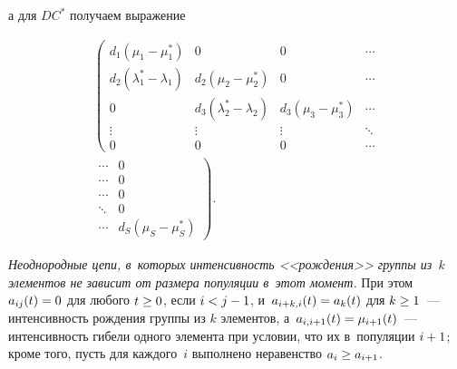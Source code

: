 \begin{multicols}{2}
\vspace*{-6pt}

\noindent 
а для  $DC^*$  получаем выражение

\vspace*{-6pt}

\noindent
\begin{multline*}
\left(
\begin{array}{cccc}
d_1\left( \mu_1-\mu_1^*\right)                                & 0                                               
& 0                                       &\cdots\\
d_2\left(\lambda_1^*-\lambda_1 \right)                        & 
d_2\left( \mu_2-\mu_2^*\right)             & 0 &\cdots                                      
\\
0                                                                  & 
d_3\left(\lambda_2^*-\lambda_2\right)      & d_3\left( \mu_3-
\mu_3^*\right)     & \cdots \\
\vdots                                                             & \vdots                                          
& \vdots                                  & \ddots \\
0                                                                  & 0                                               
& 0                                       & \cdots 
\end{array}
\right.\\
\left.
\begin{array}{cc}
\cdots & 0\\
\cdots & 0\\
 \cdots & 0\\
 \ddots & 0\\
 \cdots & d_S\left(\mu_S-
\mu_S^*\right)
\end{array}
\right).
\end{multline*}

\vspace*{-6pt}


 \textit{Неоднородные цепи, в~которых интенсивность 
<<рож\-де\-ния>> группы из~$k$ элементов не зависит от размера популяции  в~этот 
момент.} При этом $a_{ij}(t)\hm=0$ для любого $t \hm\ge 0$, если $i\hm<j\hm-1$, 
и~$a_{i+k,i}(t)\hm=a_k(t)$ для $k\hm\ge 1$~--- интенсивность рождения 
группы из $k$ элементов, а~$a_{i,i+1}(t)\hm=\mu_{i+1}(t)$~--- интенсивность 
гибели одного элемента при условии, что их в~популяции $i\hm+1$;
кроме того, пусть для каждого~$i$ выполнено неравенство $a_{i} \hm\geq a_{i+1}$.




\end{multicols}
